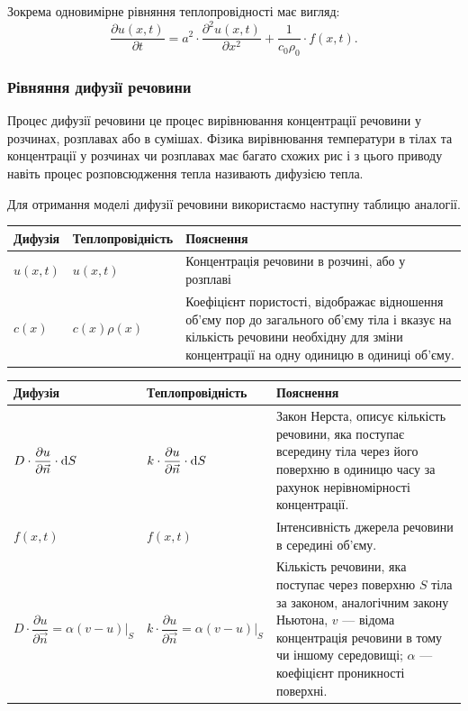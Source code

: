 \begin{remark}
	Зокрема одновимірне рівняння теплопровідності має вигляд:
	\begin{equation}
		\frac{\partial u(x, t)}{\partial t}  = a^2 \cdot \frac{\partial^2 u(x, t)}{\partial x^2} + \frac{1}{c_0 \rho_0} \cdot f(x, t).
	\end{equation}
\end{remark}

\subsubsection{Рівняння дифузії речовини}

Процес дифузії речовини це процес вирівнювання концентрації речовини у розчинах, розплавах або в сумішах. Фізика вирівнювання температури в тілах та концентрації у розчинах чи розплавах має багато схожих рис і з цього приводу навіть процес розповсюдження тепла називають дифузією тепла. \medskip

Для отримання моделі дифузії речовини використаємо наступну таблицю аналогії.
\begin{table}[H]
	\centering
	\begin{tabular}{| C{3.75cm} | C{3.75cm} | L{4.5cm} |}
		\hline
		Дифузія & Теплопровідність & Пояснення \\ \hline
		$u(x, t)$ & $u(x, t)$ & Концентрація речовини в розчині, або у розплаві \\ \hline
		$c(x)$ & $c(x) \rho(x)$ & Коефіцієнт пористості, відображає відношення об'єму пор до загального об'єму тіла і вказує на кількість речовини необхідну для зміни концентрації на одну одиницю в одиниці об'єму. \\ \hline
	\end{tabular}
\end{table}

\begin{table}[H]
	\centering
	\begin{tabular}{| C{3.75cm} | C{3.75cm} | L{4.5cm} |}
		\hline
		Дифузія & Теплопровідність & Пояснення \\ \hline
		$D \cdot \dfrac{\partial u}{\partial \vec n} \cdot \mathop{}\!\mathrm{d} S$ & $k \cdot \dfrac{\partial u}{\partial \vec n} \cdot \mathop{}\!\mathrm{d} S$ & Закон Нерста, описує кількість речовини, яка поступає всередину тіла через його поверхню в одиницю часу за рахунок нерівномірності концентрації. \\ \hline
		$f(x, t)$ & $f(x, t)$ & Інтенсивність джерела речовини в середині об'єму. \\ \hline
 		$D \cdot \dfrac{\partial u}{\partial \vec n} = \alpha \left. (v - u)\right|_S$ & $k \cdot \dfrac{\partial u}{\partial \vec n} = \alpha \left. (v - u)\right|_S$ & Кількість речовини, яка поступає  через поверхню $S$ тіла за законом, аналогічним закону Ньютона,
 		$v$ --- відома концентрація речовини в тому чи іншому середовищі; $\alpha$ --- коефіцієнт проникності поверхні. \\ \hline
 	\end{tabular}
\end{table}

